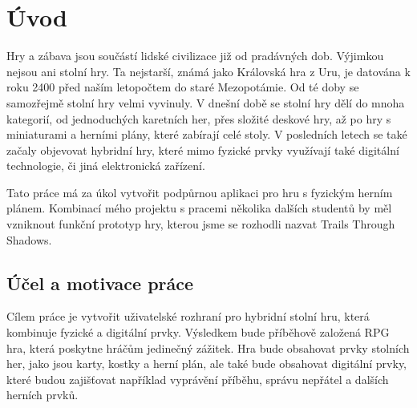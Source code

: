 \chapter{Úvod}
Hry a zábava jsou součástí lidské civilizace již od pradávných dob. Výjimkou nejsou ani stolní hry. Ta nejstarší, známá jako Královská hra z Uru\cite{royal_game_of_ur}, je datována k roku 2400 před naším letopočtem do staré Mezopotámie. Od té doby se samozřejmě stolní hry velmi vyvinuly. V dnešní době se stolní hry dělí do mnoha kategorií, od jednoduchých karetních her, přes složité deskové hry, až po hry s miniaturami a herními plány, které zabírají celé stoly. V posledních letech se také začaly objevovat hybridní hry, které mimo fyzické prvky využívají také digitální technologie, či jiná elektronická zařízení.

Tato práce má za úkol vytvořit podpůrnou aplikaci pro hru s fyzickým herním plánem. Kombinací mého projektu s pracemi několika dalších studentů by měl vzniknout funkční prototyp hry, kterou jsme se rozhodli nazvat Trails Through Shadows.

\section{Účel a motivace práce}
Cílem práce je vytvořit uživatelské rozhraní pro hybridní stolní hru, která kombinuje fyzické a digitální prvky. Výsledkem bude příběhově založená RPG hra, která poskytne hráčům jedinečný zážitek. Hra bude obsahovat prvky stolních her, jako jsou karty, kostky a herní plán, ale také bude obsahovat digitální prvky, které budou zajišťovat například vyprávění příběhu, správu nepřátel a dalších herních prvků.